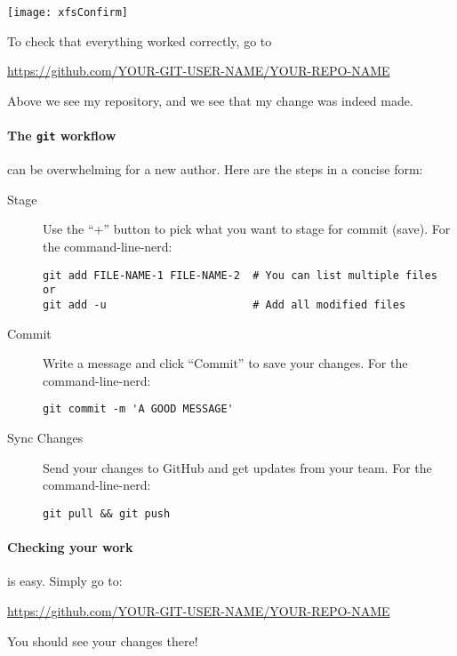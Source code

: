 \documentclass{ximera}
\begin{document}
\newpage

\begin{image}
    \texttt{[image: xfsConfirm]}
\end{image}
To check that everything worked correctly, go to
\begin{center}
    \url{https://github.com/YOUR-GIT-USER-NAME/YOUR-REPO-NAME}
\end{center}
Above we see my repository, and we see that my change was indeed made.


\paragraph{The \texttt{git} workflow} can be overwhelming for a new author. Here are the steps in a concise form:
\begin{description}
    \item[Stage] Use the ``+'' button to pick what you want to
          stage for commit (save). For the command-line-nerd:
\begin{verbatim}
git add FILE-NAME-1 FILE-NAME-2  # You can list multiple files or
git add -u                       # Add all modified files 
\end{verbatim}
    \item[Commit] Write a message and click ``Commit'' to save
          your
          changes. For the command-line-nerd:
\begin{verbatim}
git commit -m 'A GOOD MESSAGE'
\end{verbatim}
    \item[Sync Changes] Send your changes to GitHub and get updates from
          your
          team.
          For the command-line-nerd:
\begin{verbatim}
git pull && git push
\end{verbatim}
\end{description}

\paragraph{Checking your work} is easy. Simply go to:
\begin{center}
    \url{https://github.com/YOUR-GIT-USER-NAME/YOUR-REPO-NAME}
\end{center}
You should see your changes there!
\pdfOnly{\columnbreak}
\pdfOnly{\end{multicols}}



\twocolumn
\end{document}
